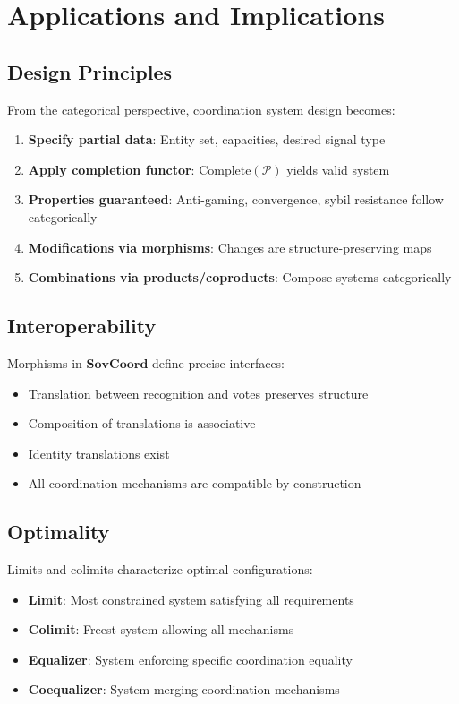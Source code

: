 \documentclass[11pt,a4paper]{article}
\theoremstyle{definition}
\theoremstyle{remark}
\newcommand{\SovCoord}{\mathbf{SovCoord}}
\begin{document}
\section{Applications and Implications}

\subsection{Design Principles}

From the categorical perspective, coordination system design becomes:

\begin{enumerate}
\item \textbf{Specify partial data}: Entity set, capacities, desired signal type
\item \textbf{Apply completion functor}: $\text{Complete}(\mathcal{P})$ yields valid system
\item \textbf{Properties guaranteed}: Anti-gaming, convergence, sybil resistance follow categorically
\item \textbf{Modifications via morphisms}: Changes are structure-preserving maps
\item \textbf{Combinations via products/coproducts}: Compose systems categorically
\end{enumerate}

\subsection{Interoperability}

Morphisms in $\SovCoord$ define precise interfaces:
\begin{itemize}
\item Translation between recognition and votes preserves structure
\item Composition of translations is associative
\item Identity translations exist
\item All coordination mechanisms are compatible by construction
\end{itemize}

\subsection{Optimality}

Limits and colimits characterize optimal configurations:
\begin{itemize}
\item \textbf{Limit}: Most constrained system satisfying all requirements
\item \textbf{Colimit}: Freest system allowing all mechanisms
\item \textbf{Equalizer}: System enforcing specific coordination equality
\item \textbf{Coequalizer}: System merging coordination mechanisms
\end{itemize}
\end{document}
